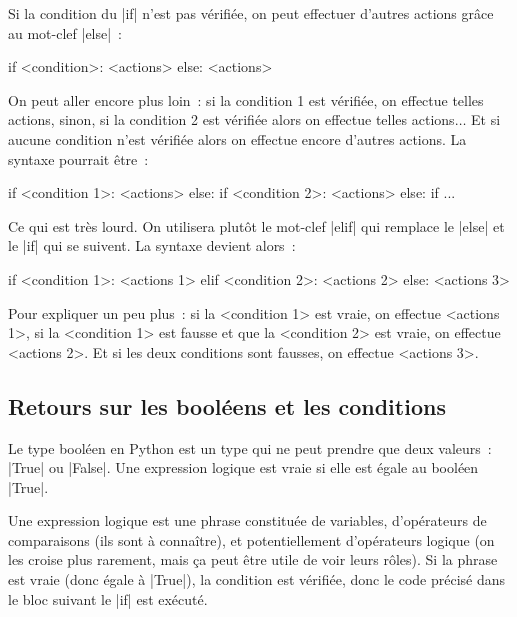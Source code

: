 		Si la condition du \python|if| n'est pas vérifiée, on peut effectuer d'autres actions grâce au mot-clef \python|else|~:
		\begin{pythoncode}
			if <condition>:
				<actions>
			else:
				<actions>
		\end{pythoncode}
		
		On peut aller encore plus loin~: si la condition 1 est vérifiée, on effectue telles actions, sinon, si la condition 2 est vérifiée alors on effectue telles actions$\ldots$ Et si aucune condition n'est vérifiée alors on effectue encore d'autres actions. La syntaxe pourrait être~:
		\begin{pythoncode}
			if <condition 1>:
				<actions>
			else:
				if <condition 2>:
					<actions>
				else:
					if ...
		\end{pythoncode}
		
		Ce qui est très lourd. On utilisera plutôt le mot-clef \python|elif| qui remplace le \python|else| et le \python|if| qui se suivent. La syntaxe devient alors~:
		\begin{pythoncode}
			if <condition 1>:
				<actions 1>
			elif <condition 2>:
				<actions 2>
			else:
				<actions 3>
		\end{pythoncode}
		
		Pour expliquer un peu plus~: si la <condition 1> est vraie, on effectue <actions 1>, si la <condition 1> est fausse et que la <condition 2> est vraie, on effectue <actions 2>. Et si les deux conditions sont fausses, on effectue <actions 3>.
			
	\subsection{Retours sur les booléens et les conditions} \label{logique}
		
		Le type booléen en Python est un type qui ne peut prendre que deux valeurs~: \python|True| ou \python|False|. Une expression logique est vraie si elle est égale au booléen \python|True|.
		
		Une expression logique est une phrase constituée de variables, d'opérateurs de comparaisons (ils sont à connaître), et potentiellement d'opérateurs logique (on les croise plus rarement, mais ça peut être utile de voir leurs rôles).
		Si la phrase est vraie (donc égale à \python|True|), la condition est vérifiée, donc le code précisé dans le bloc suivant le \python|if| est exécuté.
		
